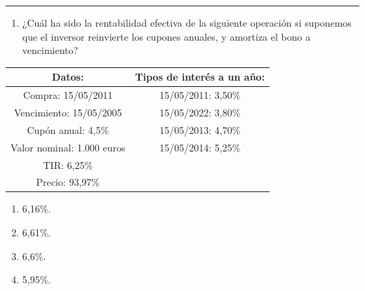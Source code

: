 \documentclass[
  letterpaper,
  DIV=11,
  numbers=noendperiod]{scrreprt}
\providecommand{\tightlist}{%
  \setlength{\itemsep}{0pt}\setlength{\parskip}{0pt}}\usepackage{longtable,booktabs,array}
\begin{document}
\begin{center}\rule{0.5\linewidth}{0.5pt}\end{center}

\begin{enumerate}
\def\labelenumi{\arabic{enumi}.}
\setcounter{enumi}{60}
\tightlist
\item
  ¿Cuál ha sido la rentabilidad efectiva de la siguiente operación si
  suponemos que el inversor reinvierte los cupones anuales, y amortiza
  el bono a vencimiento?
\end{enumerate}

\begin{longtable}[]{@{}cc@{}}
\toprule()
\textbf{Datos:} & \textbf{Tipos de interés a un año:} \\
\midrule()
\endhead
Compra: 15/05/2011 & 15/05/2011: 3,50\% \\
Vencimiento: 15/05/2005 & 15/05/2022: 3,80\% \\
Cupón anual: 4,5\% & 15/05/2013: 4,70\% \\
Valor nominal: 1.000 euros & 15/05/2014: 5,25\% \\
TIR: 6,25\% & \\
Precio: 93,97\% & \\
\bottomrule()
\end{longtable}

\begin{enumerate}
\def\labelenumi{\alph{enumi})}
\item
  6,16\%.
\item
  6,61\%.
\item
  6,6\%.
\item
  5,95\%.
\end{enumerate}
\end{document}
